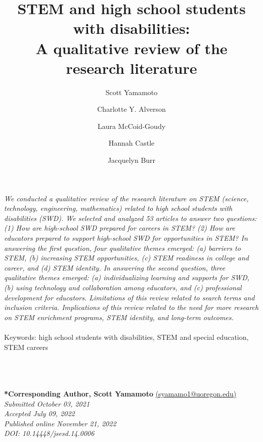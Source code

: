 \documentclass[11pt]{sig-alternate}
\makeatletter
\let\oldabstract\abstract
\let\oldendabstract\endabstract
\renewenvironment{abstract}
{\renewenvironment{quotation}%
               {\list{}{\addtolength{\leftmargin}{1em} %
                        \listparindent 1.5em%
                        \itemindent    \listparindent%
                        \rightmargin   \leftmargin%
                        \parsep        \z@ \@plus\p@}%
                \item\relax}%
               {\endlist}%
\oldabstract}
{\oldendabstract}
\makeatother
\begin{document}
\title{STEM and high school students with disabilities:\\
A qualitative review of the research literature}

\author[1]{\large \color{blue} Scott Yamamoto}
\author[1]{\large \color{blue} Charlotte Y. Alverson}
\author[1]{\large \color{blue}   Laura McCoid-Goudy}
\author[1]{\large \color{blue}   Hannah Castle}
\author[1]{\large \color{blue}   Jacquelyn Burr}


\toappear{}

\maketitle
\begin{@twocolumnfalse} 

\begin{abstract}
     \textit{We conducted a qualitative review of the research literature on STEM (science, technology, engineering, mathematics) related to high school students with disabilities (SWD). We selected and analyzed 53 articles to answer two questions: (1) How are high-school SWD prepared for careers in STEM? (2) How are educators prepared to support high-school SWD for opportunities in STEM? In answering the first question, four qualitative themes emerged: (a) barriers to STEM, (b) increasing STEM opportunities, (c) STEM readiness in college and career, and (d) STEM identity. In answering the second question, three qualitative themes emerged: (a) individualizing learning and supports for SWD, (b) using technology and collaboration among educators, and (c) professional development for educators. Limitations of this review related to search terms and inclusion criteria. Implications of this review related to the need for more research on STEM enrichment programs, STEM identity, and long-term outcomes.}
     \\
     \\
     Keywords: high school students with disabilities, STEM and special education, STEM careers
\end{abstract}
\end{@twocolumnfalse}



\\ \\ \\
\textbf{*Corresponding Author, Scott Yamamoto} \href{mailto:syamamo1@uoregon.edu}{(syamamo1@uoregon.edu)} \\
\textit{Submitted October 03, 2021 }\\
\textit{Accepted July 09, 2022} \\
\textit{Published online November 21, 2022} \\
\textit{DOI: 10.14448/jsesd.14.0006} \\
\end{document}
